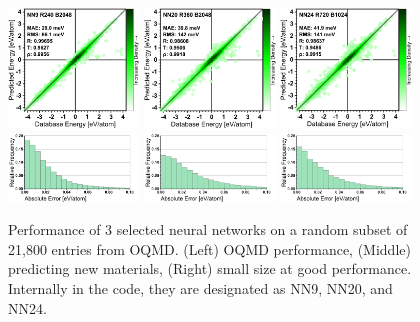 \begin{figure}[H]
    \centering
    \includegraphics[width=0.31\textwidth]{sipfenn/NN9_test.png}
    \hspace{0.01\textwidth}
    \includegraphics[width=0.31\textwidth]{sipfenn/NN20_test.png}
    \hspace{0.01\textwidth}
    \includegraphics[width=0.31\textwidth]{sipfenn/NN24_test.png}
    \includegraphics[width=0.31\textwidth]{sipfenn/nn9_histogram.png}
    \hspace{0.01\textwidth}
    \includegraphics[width=0.31\textwidth]{sipfenn/nn20_histogram.png}
    \hspace{0.01\textwidth}
    \includegraphics[width=0.31\textwidth]{sipfenn/nn24_histogram.png}
    \caption{Performance of 3 selected neural networks on a random subset of 21,800 entries from OQMD. (Left) OQMD performance, (Middle) predicting new materials, (Right) small size at good performance. Internally in the code, they are designated as NN9, NN20, and NN24.}
    \label{sipfenn:fig:oqmdperformance}
\end{figure}

